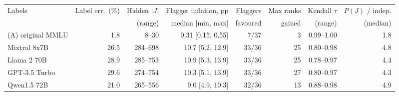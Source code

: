\begin{tabular}{lrrrrrrr}
\toprule
Labels & Label err.\ (\%) & Hidden $|J|$ & Flagger inflation, pp & Flaggers & Max ranks & Kendall $\tau$ & $P(J)$ / indep. \\
 & & (range) & median [min, max] & favoured & gained & (range) & (median) \\
\midrule
(A) original MMLU & 1.8 & 8--30 & 0.31 [0.15, 0.55] & 7/37 & 3 & 0.99--1.00 & 1.8 \\
\midrule
Mixtral 8x7B & 26.5 & 284--698 & 10.7 [5.2, 12.9] & 33/36 & 25 & 0.80--0.98 & 4.8 \\
Llama 2 70B & 28.9 & 285--753 & 10.9 [5.3, 13.9] & 33/36 & 25 & 0.78--0.97 & 4.4 \\
GPT-3.5 Turbo & 29.6 & 274--754 & 10.3 [5.1, 13.9] & 33/36 & 27 & 0.80--0.97 & 4.3 \\
Qwen1.5 72B & 21.0 & 265--556 & 9.0 [4.9, 10.3] & 32/36 & 13 & 0.88--0.98 & 4.9 \\
\bottomrule
\end{tabular}
